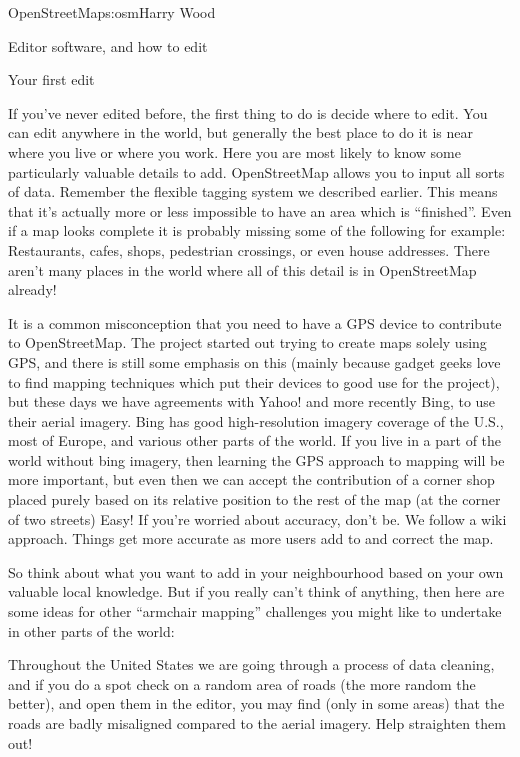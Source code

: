 \begin{aosachapter}{OpenStreetMap}{s:osm}{Harry Wood}
\begin{aosasect1}{Editor software, and how to edit}
\begin{aosasect2}{Your first edit}

If you've never edited before, the first thing to do is decide where
to edit. You can edit anywhere in the world, but generally the best
place to do it is near where you live or where you work. Here you are
most likely to know some particularly valuable details to
add. OpenStreetMap allows you to input all sorts of data. Remember the
flexible tagging system we described earlier. This means that it's
actually more or less impossible to have an area which is
``finished''. Even if a map looks complete it is probably missing some
of the following for example: Restaurants, cafes, shops, pedestrian
crossings, or even house addresses. There aren't many places in the
world where all of this detail is in OpenStreetMap already!

It is a common misconception that you need to have a GPS device to
contribute to OpenStreetMap. The project started out trying to create
maps solely using GPS, and there is still some emphasis on this
(mainly because gadget geeks love to find mapping techniques which put
their devices to good use for the project), but these days we have
agreements with Yahoo! and more recently Bing, to use their aerial
imagery. Bing has good high-resolution imagery coverage of the U.S.,
most of Europe, and various other parts of the world. If you live in a
part of the world without bing imagery, then learning the GPS approach
to mapping will be more important, but even then we can accept the
contribution of a corner shop placed purely based on its relative
position to the rest of the map (at the corner of two streets) Easy!
If you're worried about accuracy, don't be. We follow a wiki
approach. Things get more accurate as more users add to and correct
the map.

So think about what you want to add in your neighbourhood based on
your own valuable local knowledge. But if you really can't think of
anything, then here are some ideas for other ``armchair mapping''
challenges you might like to undertake in other parts of the world:

\begin{aosaitemize}

\item Throughout the United States we are going through a process of
  data cleaning, and if you do a spot check on a random area of roads
  (the more random the better), and open them in the editor, you may
  find (only in some areas) that the roads are badly misaligned
  compared to the aerial imagery. Help straighten them out!


\end{aosaitemize}
\end{aosasect2}
\end{aosasect1}
\end{aosachapter}
